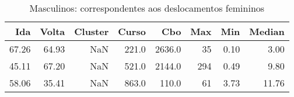 \begin{table}
\centering
\caption{Masculinos: correspondentes aos deslocamentos femininos}
\label{tab:Salarios_Desequlibrio_F}
\begin{tabular}{rrrrrrrr}
\toprule
  Ida &  Volta &  Cluster &  Curso &    Cbo &  Max &  Min &  Median \\
\midrule
67.26 &  64.93 &      NaN &  221.0 & 2636.0 &   35 & 0.10 &    3.00 \\
45.11 &  67.20 &      NaN &  521.0 & 2144.0 &  294 & 0.49 &    9.80 \\
58.06 &  35.41 &      NaN &  863.0 &  110.0 &   61 & 3.73 &   11.76 \\
\bottomrule
\end{tabular}
\end{table}
